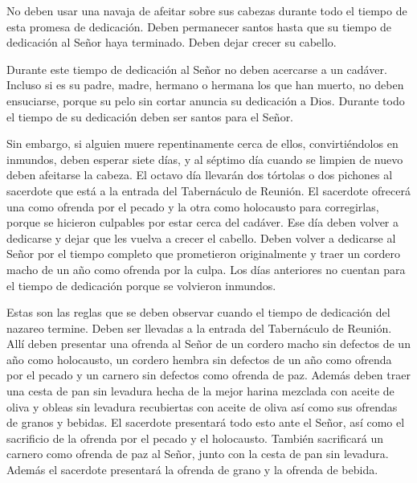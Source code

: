  No deben usar una navaja de afeitar sobre sus cabezas
durante todo el tiempo de esta promesa de dedicación. Deben permanecer
santos hasta que su tiempo de dedicación al Señor haya terminado. Deben
dejar crecer su cabello.

 Durante este tiempo de dedicación al Señor no deben
acercarse a un cadáver.  Incluso si es su padre, madre,
hermano o hermana los que han muerto, no deben ensuciarse, porque su
pelo sin cortar anuncia su dedicación a Dios.  Durante todo
el tiempo de su dedicación deben ser santos para el Señor.

 Sin embargo, si alguien muere repentinamente cerca de
ellos, convirtiéndolos en inmundos, deben esperar siete días, y al
séptimo día cuando se limpien de nuevo deben afeitarse la cabeza.
 El octavo día llevarán dos tórtolas o dos pichones al
sacerdote que está a la entrada del Tabernáculo de Reunión.
 El sacerdote ofrecerá una como ofrenda por el pecado y la
otra como holocausto para corregirlas, porque se hicieron culpables por
estar cerca del cadáver. Ese día deben volver a dedicarse y dejar que
les vuelva a crecer el cabello.  Deben volver a dedicarse
al Señor por el tiempo completo que prometieron originalmente y traer un
cordero macho de un año como ofrenda por la culpa. Los días anteriores
no cuentan para el tiempo de dedicación porque se volvieron inmundos.

 Estas son las reglas que se deben observar cuando el
tiempo de dedicación del nazareo termine. Deben ser llevadas a la
entrada del Tabernáculo de Reunión.  Allí deben presentar
una ofrenda al Señor de un cordero macho sin defectos de un año como
holocausto, un cordero hembra sin defectos de un año como ofrenda por el
pecado y un carnero sin defectos como ofrenda de paz. 
Además deben traer una cesta de pan sin levadura hecha de la mejor
harina mezclada con aceite de oliva y obleas sin levadura recubiertas
con aceite de oliva así como sus ofrendas de granos y bebidas.
 El sacerdote presentará todo esto ante el Señor, así como
el sacrificio de la ofrenda por el pecado y el holocausto. 
También sacrificará un carnero como ofrenda de paz al Señor, junto con
la cesta de pan sin levadura. Además el sacerdote presentará la ofrenda
de grano y la ofrenda de bebida.

